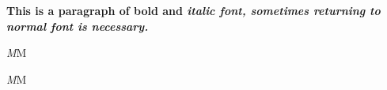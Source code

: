 \documentclass{article}
\begin{document}
\sffamily
\textbf{This is a paragraph of bold and
\textit{italic font, sometimes returning
to \textnormal{normal font} is necessary.}}

\textit{M}M

\textit{M\nocorr}M
\end{document}
